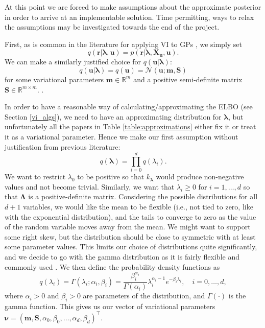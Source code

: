 \documentclass{mprop}
\theoremstyle{definition}
\begin{document}
At this point we are forced to make assumptions about the approximate posterior
in order to arrive at an implementable solution. Time permitting, ways to relax
the assumptions may be investigated towards the end of the project.

First, as is common in the literature for applying VI to GPs
\cite{DBLP:conf/nips/ChengB17,DBLP:conf/uai/HensmanFL13,DBLP:conf/icml/HoangHL15,DBLP:journals/jmlr/Titsias09},
we simply set
\begin{equation}
  q(\mathbf{r} | \bm\lambda, \mathbf{u}) = p(\mathbf{r} | \bm\lambda, \mathbf{X_u},
  \mathbf{u}).
\end{equation}
We can make a similarly justified choice for $q(\mathbf{u} | \bm\lambda)$:
\begin{equation}
  q(\mathbf{u} | \bm\lambda) = q(\mathbf{u}) = \mathcal{N}(\mathbf{u}; \mathbf{m}, \mathbf{S})
\end{equation}
for some variational parameters $\mathbf{m} \in \mathbb{R}^{m}$ and a positive
semi-definite matrix $\mathbf{S} \in \mathbb{R}^{m \times m}$.
\cite{DBLP:conf/nips/ChengB17,DBLP:journals/jmlr/HensmanDS17,DBLP:conf/aaai/HoangHL17}.

In order to have a reasonable way of calculating/approximating the ELBO (see
Section \ref{vi_algs}), we need to have an approximating distribution for
$\bm\lambda$, but unfortunately all the papers in Table \ref{table:approximations}
either fix it or treat it as a variational parameter. Hence we make our first
assumption without justification from previous literature:
\begin{equation} \label{eq:theta}
  q(\bm\lambda) = \prod_{i=0}^dq(\lambda_i).
\end{equation}
We want to restrict $\lambda_0$ to be positive so that $k_{\bm\lambda}$ would
produce non-negative values and not become trivial. Similarly, we want that
$\lambda_i \ge 0$ for $i = 1, \dots, d$ so that $\bm\Lambda$ is a
positive-definite matrix. Considering the possible distributions for all $d + 1$
variables, we would like the mean to be flexible (i.e., not tied to zero, like
with the exponential distribution), and the tails to converge to zero as the
value of the random variable moves away from the mean. We might want to support
some right skew, but the distribution should be close to symmetric with at least
some parameter values. This limits our choice of distributions quite
significantly, and we decide to go with the gamma distribution as it is fairly
flexible and commonly used \cite{hogg2018introduction}. We then define the
probability density functions as
\begin{equation} \label{eq:zeta}
  q(\lambda_i) = \Gamma(\lambda_i; \alpha_i, \beta_i) =
  \frac{\beta_i^{\alpha_i}}{\Gamma(\alpha_i)}\lambda_i^{\alpha_i - 1}e^{-\beta_i\lambda_i}, \quad i = 0, \dots, d,
\end{equation}
where $\alpha_i > 0$ and $\beta_i > 0$ are parameters of the distribution, and
$\Gamma(\cdot)$ is the gamma function. This gives us our
vector of variational parameters $\bm\nu = (\mathbf{m}, \mathbf{S}, \alpha_0,
\beta_0, \dots, \alpha_d, \beta_d)^\intercal$.
\end{document}
